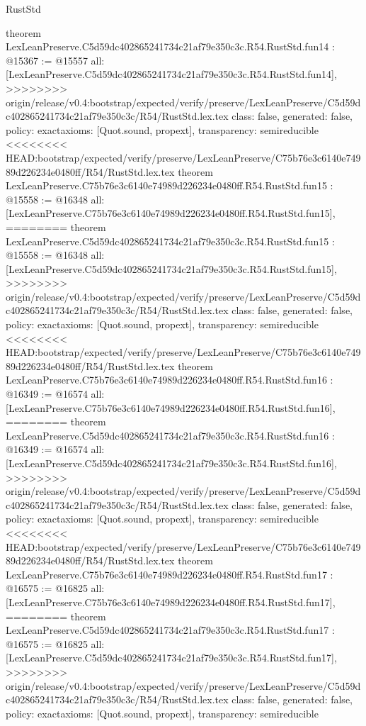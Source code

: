 \begin{lexlean}{RustStd}
\begin{coremodule}
{\begin{coremodule}
{{{{{{{{{{{{{{{{{theorem LexLeanPreserve.C5d59dc402865241734c21af79e350c3c.R54.RustStd.fun14 : @15367 := @15557 {
  all: [LexLeanPreserve.C5d59dc402865241734c21af79e350c3c.R54.RustStd.fun14],
>>>>>>>> origin/release/v0.4:bootstrap/expected/verify/preserve/LexLeanPreserve/C5d59dc402865241734c21af79e350c3c/R54/RustStd.lex.tex
  class: false,
  generated: false,
  policy: exact{axioms: [Quot.sound, propext]},
  transparency: semireducible
}
<<<<<<<< HEAD:bootstrap/expected/verify/preserve/LexLeanPreserve/C75b76e3c6140e74989d226234e0480ff/R54/RustStd.lex.tex
theorem LexLeanPreserve.C75b76e3c6140e74989d226234e0480ff.R54.RustStd.fun15 : @15558 := @16348 {
  all: [LexLeanPreserve.C75b76e3c6140e74989d226234e0480ff.R54.RustStd.fun15],
========
theorem LexLeanPreserve.C5d59dc402865241734c21af79e350c3c.R54.RustStd.fun15 : @15558 := @16348 {
  all: [LexLeanPreserve.C5d59dc402865241734c21af79e350c3c.R54.RustStd.fun15],
>>>>>>>> origin/release/v0.4:bootstrap/expected/verify/preserve/LexLeanPreserve/C5d59dc402865241734c21af79e350c3c/R54/RustStd.lex.tex
  class: false,
  generated: false,
  policy: exact{axioms: [Quot.sound, propext]},
  transparency: semireducible
}
<<<<<<<< HEAD:bootstrap/expected/verify/preserve/LexLeanPreserve/C75b76e3c6140e74989d226234e0480ff/R54/RustStd.lex.tex
theorem LexLeanPreserve.C75b76e3c6140e74989d226234e0480ff.R54.RustStd.fun16 : @16349 := @16574 {
  all: [LexLeanPreserve.C75b76e3c6140e74989d226234e0480ff.R54.RustStd.fun16],
========
theorem LexLeanPreserve.C5d59dc402865241734c21af79e350c3c.R54.RustStd.fun16 : @16349 := @16574 {
  all: [LexLeanPreserve.C5d59dc402865241734c21af79e350c3c.R54.RustStd.fun16],
>>>>>>>> origin/release/v0.4:bootstrap/expected/verify/preserve/LexLeanPreserve/C5d59dc402865241734c21af79e350c3c/R54/RustStd.lex.tex
  class: false,
  generated: false,
  policy: exact{axioms: [Quot.sound, propext]},
  transparency: semireducible
}
<<<<<<<< HEAD:bootstrap/expected/verify/preserve/LexLeanPreserve/C75b76e3c6140e74989d226234e0480ff/R54/RustStd.lex.tex
theorem LexLeanPreserve.C75b76e3c6140e74989d226234e0480ff.R54.RustStd.fun17 : @16575 := @16825 {
  all: [LexLeanPreserve.C75b76e3c6140e74989d226234e0480ff.R54.RustStd.fun17],
========
theorem LexLeanPreserve.C5d59dc402865241734c21af79e350c3c.R54.RustStd.fun17 : @16575 := @16825 {
  all: [LexLeanPreserve.C5d59dc402865241734c21af79e350c3c.R54.RustStd.fun17],
>>>>>>>> origin/release/v0.4:bootstrap/expected/verify/preserve/LexLeanPreserve/C5d59dc402865241734c21af79e350c3c/R54/RustStd.lex.tex
  class: false,
  generated: false,
  policy: exact{axioms: [Quot.sound, propext]},
  transparency: semireducible
}}}}}}}}}}}}}}}}}}}}}
\end{coremodule}}
\end{coremodule}
\end{lexlean}
